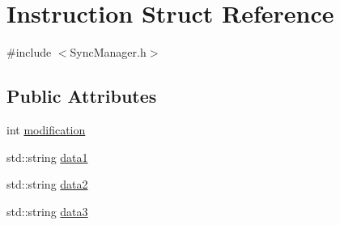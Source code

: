 \hypertarget{structInstruction}{\section{Instruction Struct Reference}
\label{structInstruction}
}


{\ttfamily \#include $<$Sync\-Manager.\-h$>$}

\subsection*{Public Attributes}
\begin{DoxyCompactItemize}
\item 
int \hyperlink{structInstruction_a9f627f3906fb312ecea13411a28a686f}{modification}
\item 
std\-::string \hyperlink{structInstruction_ad7d1d4043e18a9423c7552a7e9ce9a12}{data1}
\item 
std\-::string \hyperlink{structInstruction_a903d2f41be2643dadbf6035f8a15644d}{data2}
\item 
std\-::string \hyperlink{structInstruction_a8abe197055a519475ed6af2567c44dc9}{data3}
\end{DoxyCompactItemize}


